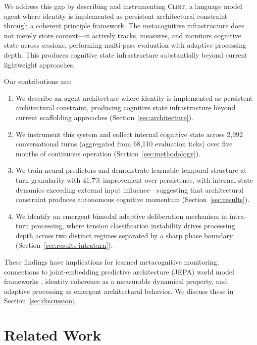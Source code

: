 \documentclass[twoside,11pt]{article}
\newcommand{\sys}{\textsc{Clint}}
\begin{document}
We address this gap by describing and instrumenting \sys{}, a language model
agent where identity is implemented as persistent architectural constraint
through a coherent principle framework. The metacognitive infrastructure does
not merely store context---it actively tracks, measures, and monitors cognitive
state across sessions, performing multi-pass evaluation with adaptive processing
depth. This produces cognitive state infrastructure substantially beyond current
lightweight approaches.

Our contributions are:
\begin{enumerate}
\item We describe an agent architecture where identity is implemented as
persistent architectural constraint, producing cognitive state infrastructure
beyond current scaffolding approaches (Section~\ref{sec:architecture}).

\item We instrument this system and collect internal cognitive state across
2,992 conversational turns (aggregated from 68,110 evaluation ticks) over five
months of continuous operation (Section~\ref{sec:methodology}).

\item We train neural predictors and demonstrate learnable temporal structure at
turn granularity with 41.7\% improvement over persistence, with internal state
dynamics exceeding external input influence---suggesting that architectural
constraint produces autonomous cognitive momentum
(Section~\ref{sec:results}).

\item We identify an emergent bimodal adaptive deliberation mechanism in
intra-turn processing, where tension classification instability drives
processing depth across two distinct regimes separated by a sharp phase
boundary (Section~\ref{sec:results-intraturn}).
\end{enumerate}

These findings have implications for learned metacognitive monitoring,
connections to joint-embedding predictive architecture (JEPA) world model
frameworks \citep{lecun2022path, maes2026lewm}, identity coherence as a
measurable dynamical property, and adaptive processing as emergent
architectural behavior. We discuss these in Section~\ref{sec:discussion}.


\section{Related Work}
\label{sec:related}
\end{document}
